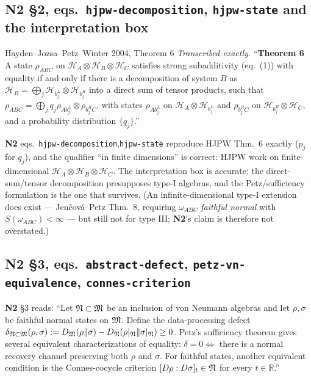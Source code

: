 \documentclass[11pt]{article}
\newcommand{\NII}{\textbf{N2}}
\newcommand{\loc}[1]{{\small\texttt{#1}}}
\newcommand{\1}{\mathbf 1}
\begin{document}
\subsection{N2 \S2, eqs.\ \loc{hjpw-decomposition}, \loc{hjpw-state} and the interpretation box}
\begin{citedbox}{Hayden--Jozsa--Petz--Winter 2004, Theorem 6}
\emph{Transcribed exactly.} ``\textbf{Theorem 6} A state $\rho_{ABC}$ on $\mathcal H_A\otimes\mathcal H_B\otimes\mathcal H_C$
satisfies strong subadditivity (eq.~(1)) with equality if and only if there is a decomposition of
system $B$ as $\mathcal H_B=\bigoplus_j\mathcal H_{b_j^L}\otimes\mathcal H_{b_j^R}$ into a direct sum of
tensor products, such that $\rho_{ABC}=\bigoplus_jq_j\rho_{Ab_j^L}\otimes\rho_{b_j^RC}$, with states
$\rho_{Ab_j^L}$ on $\mathcal H_A\otimes\mathcal H_{b_j^L}$ and $\rho_{b_j^RC}$ on
$\mathcal H_{b_j^R}\otimes\mathcal H_C$, and a probability distribution $\{q_j\}$.''\\[2pt]
\end{citedbox}
\begin{verdictok}
\NII{} eqs.~\loc{hjpw-decomposition},\loc{hjpw-state} reproduce HJPW Thm.~6 exactly ($p_j$ for $q_j$),
and the qualifier ``in finite dimensions'' is correct: HJPW work on finite-dimensional
$\mathcal H_A\otimes\mathcal H_B\otimes\mathcal H_C$. The interpretation box is accurate: the
direct-sum/tensor decomposition presupposes type-I algebras, and the Petz/sufficiency formulation is
the one that survives. (An infinite-dimensional type-I extension does exist ---
Jen\v{c}ov\'a--Petz Thm.~8, requiring $\omega_{ABC}$ \emph{faithful normal} with $S(\omega_{ABC})<\infty$ ---
but still not for type III; \NII's claim is therefore not overstated.)
\end{verdictok}

\subsection{N2 \S3, eqs.\ \loc{abstract-defect}, \loc{petz-vn-equivalence}, \loc{connes-criterion}}

\NII{} \S3 reads: ``Let $\mathfrak N\subset\mathfrak M$ be an inclusion of von Neumann algebras and let $\rho,\sigma$
be faithful normal states on $\mathfrak M$. Define the data-processing defect
$\delta_{\mathfrak N\subset\mathfrak M}(\rho,\sigma):=D_{\mathfrak M}(\rho\|\sigma)-D_{\mathfrak N}(\rho|_{\mathfrak N}\|\sigma|_{\mathfrak N})\ge0$.
Petz's sufficiency theorem gives several equivalent characterizations of equality:
$\delta=0\iff$ there is a normal recovery channel preserving both $\rho$ and $\sigma$.
For faithful states, another equivalent condition is the Connes-cocycle criterion
$[D\rho:D\sigma]_t\in\mathfrak N$ for every $t\in\mathbb R$.''
\end{document}

